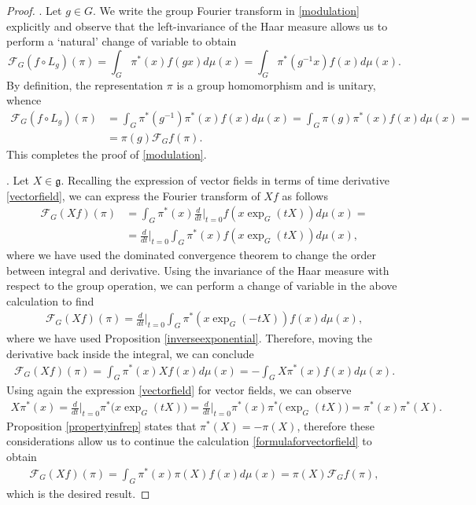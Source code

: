 \documentclass[12pt,oneside,a4paper]{book}
\numberwithin{equation}{section}     %
\theoremstyle{plain}
\theoremstyle{definition}
\begin{document}
\begin{proof}
	. Let $g\in G$. We write the group Fourier transform in \eqref{modulation} explicitly and observe that the left-invariance of the Haar measure allows us to perform a `natural' change of variable to obtain
	\[
	\mathcal{F}_G(f\circ L_g)(\pi)=\int_G\pi^*(x)f(gx)d\mu(x)=\int_G\pi^*(g^{-1}x)f(x)d\mu(x).
	\]
	By definition, the representation $\pi$ is a group homomorphism and is unitary, whence
	\begin{align*}
	\mathcal{F}_G(f\circ L_g)(\pi)&=\int_G\pi^*(g^{-1})\pi^*(x)f(x)d\mu(x)=\int_G\pi(g)\pi^*(x)f(x)d\mu(x)=\\
	&=\pi(g)\mathcal{F}_Gf(\pi).
	\end{align*}
	This completes the proof of \eqref{modulation}. 
	
	. Let $X\in\mathfrak{g}$. Recalling the expression of vector fields in terms of time derivative \eqref{vectorfield}, we can express the Fourier transform of $Xf$ as follows
	\begin{align*}
	\mathcal{F}_G(Xf)(\pi)&=\int_G \pi^*(x)\frac{d}{dt}\Bigr|_{t=0}f(x\exp_{G}(tX))d\mu(x)=\\
	&=\frac{d}{dt}\Bigr|_{t=0}\int_G\pi^*(x)f(x\exp_{G}(tX))d\mu(x),
	\end{align*}
	where we have used the dominated convergence theorem to change the order between integral and derivative. Using the invariance of the Haar measure with respect to the group operation, we can perform a change of variable in the above calculation to find
	\begin{align*}
	\mathcal{F}_G(Xf)(\pi)=\frac{d}{dt}\Bigr|_{t=0}\int_G\pi^*(x\exp_{G}(-tX))f(x)d\mu(x),
	\end{align*}
	where we have used Proposition \ref{inverseexponential}. Therefore, moving the derivative back inside the integral, we can conclude
	\begin{align}\label{formulaforvectorfield}
	\mathcal{F}_G(Xf)(\pi)=\int_G \pi^*(x)Xf(x)d\mu(x)=-\int_GX\pi^*(x)f(x)d\mu(x).
	\end{align}
	Using again the expression \eqref{vectorfield} for vector fields, we can observe 
	\begin{align*}
	X\pi^*(x)=\frac{d}{dt}\Bigr|_{t=0}\pi^*\big(x\exp_{G}(tX)\big)=\frac{d}{dt}\Bigr|_{t=0}\pi^*(x)\pi^*\big(\exp_{G}(tX) \big)=\pi^*(x)\pi^*(X).
	\end{align*}
	Proposition \ref{propertyinfrep} states that $\pi^*(X)=-\pi(X)$, therefore these considerations allow us to continue the calculation \eqref{formulaforvectorfield} to obtain
	\begin{align*}
	\mathcal{F}_G(Xf)(\pi)=\int_G\pi^*(x)\pi(X)f(x)d\mu(x)=\pi(X)\mathcal{F}_Gf(\pi),
	\end{align*}
	which is the desired result.
\end{proof}
\end{document}
